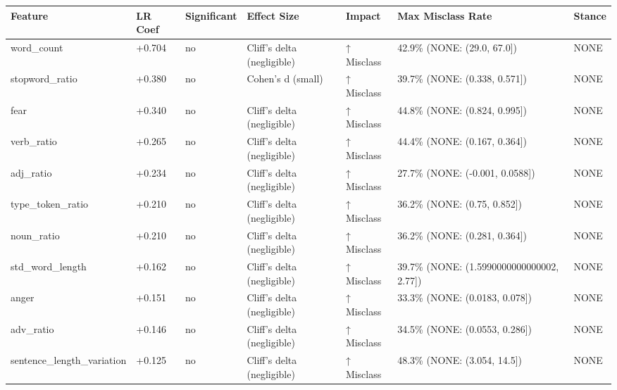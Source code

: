 \begin{tabular}{lllllll}
\toprule
Feature & LR Coef & Significant & Effect Size & Impact & Max Misclass Rate & Stance \\
\midrule
word\_count & +0.704 & no & Cliff's delta (negligible) & ↑ Misclass & 42.9\% (NONE: (29.0, 67.0]) & NONE \\
stopword\_ratio & +0.380 & no & Cohen's d (small) & ↑ Misclass & 39.7\% (NONE: (0.338, 0.571]) & NONE \\
fear & +0.340 & no & Cliff's delta (negligible) & ↑ Misclass & 44.8\% (NONE: (0.824, 0.995]) & NONE \\
verb\_ratio & +0.265 & no & Cliff's delta (negligible) & ↑ Misclass & 44.4\% (NONE: (0.167, 0.364]) & NONE \\
adj\_ratio & +0.234 & no & Cliff's delta (negligible) & ↑ Misclass & 27.7\% (NONE: (-0.001, 0.0588]) & NONE \\
type\_token\_ratio & +0.210 & no & Cliff's delta (negligible) & ↑ Misclass & 36.2\% (NONE: (0.75, 0.852]) & NONE \\
noun\_ratio & +0.210 & no & Cliff's delta (negligible) & ↑ Misclass & 36.2\% (NONE: (0.281, 0.364]) & NONE \\
std\_word\_length & +0.162 & no & Cliff's delta (negligible) & ↑ Misclass & 39.7\% (NONE: (1.5990000000000002, 2.77]) & NONE \\
anger & +0.151 & no & Cliff's delta (negligible) & ↑ Misclass & 33.3\% (NONE: (0.0183, 0.078]) & NONE \\
adv\_ratio & +0.146 & no & Cliff's delta (negligible) & ↑ Misclass & 34.5\% (NONE: (0.0553, 0.286]) & NONE \\
sentence\_length\_variation & +0.125 & no & Cliff's delta (negligible) & ↑ Misclass & 48.3\% (NONE: (3.054, 14.5]) & NONE \\
\bottomrule
\end{tabular}
